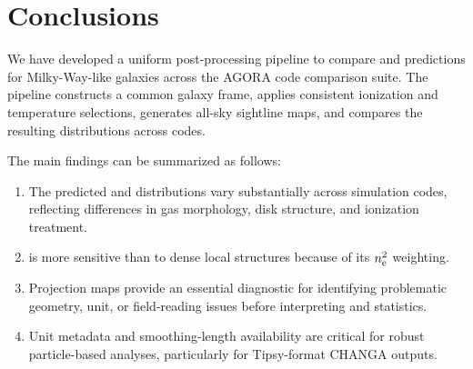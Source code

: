 \documentclass[twocolumn]{aastex631}
\newcommand{\DM}{\mathrm{DM}}
\newcommand{\EM}{\mathrm{EM}}
\newcommand{\ne}{n_{\rm e}}
\begin{document}
\section{Conclusions}\label{sec:conclusions}
We have developed a uniform post-processing pipeline to compare \DM{} and \EM{} predictions for Milky-Way-like galaxies across the AGORA code comparison suite.  The pipeline constructs a common galaxy frame, applies consistent ionization and temperature selections, generates all-sky sightline maps, and compares the resulting distributions across codes.

The main findings can be summarized as follows:
\begin{enumerate}
    \item The predicted \DM{} and \EM{} distributions vary substantially across simulation codes, reflecting differences in gas morphology, disk structure, and ionization treatment.
    \item \EM{} is more sensitive than \DM{} to dense local structures because of its $\ne^2$ weighting.
    \item Projection maps provide an essential diagnostic for identifying problematic geometry, unit, or field-reading issues before interpreting \DM{} and \EM{} statistics.
    \item Unit metadata and smoothing-length availability are critical for robust particle-based analyses, particularly for Tipsy-format CHANGA outputs.
\end{enumerate}

\acknowledgments




\end{document}
